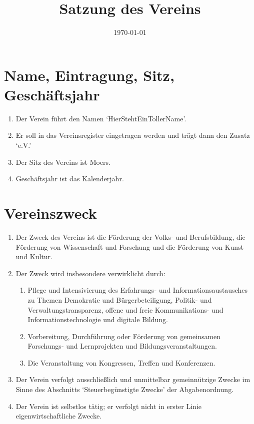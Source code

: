 \documentclass[12pt,a4paper,draft]{article}
\title{Satzung des Vereins \unsername} %
\author{\unsername}
\date{\today}
\newcommand{\unsername}{HierStehtEinTollerName}
\begin{document}
\maketitle
\tableofcontents

\section{Name, Eintragung, Sitz, Geschäftsjahr}
\begin{enumerate}
\item Der Verein führt den Namen `\unsername'.

\item Er soll in das Vereinsregister eingetragen werden und trägt dann den 
Zusatz `e.V.'

\item Der Sitz des Vereins ist Moers. %

\item Geschäftsjahr ist das Kalenderjahr.
\end{enumerate}

\section{Vereinszweck} %
\begin{enumerate}
\item Der Zweck des Vereins ist die Förderung der Volks- und Berufsbildung, die 
Förderung von Wissenschaft und Forschung und die Förderung von Kunst und 
Kultur. %

\item Der Zweck wird insbesondere verwirklicht durch:

\begin{enumerate}
\item Pflege und Intensivierung des Erfahrungs- und Informationsaustausches zu 
Themen Demokratie und Bürgerbeteiligung, Politik- und Verwaltungstransparenz, offene und freie Kommunikations- und Informationstechnologie und digitale Bildung.

\item Vorbereitung, Durchführung oder Förderung von gemeinsamen Forschungs- und 
Lernprojekten und Bildungsveranstaltungen.

\item Die Veranstaltung von Kongressen, Treffen und Konferenzen.
\end{enumerate}

\item Der Verein verfolgt ausschließlich und unmittelbar gemeinnützige Zwecke 
im Sinne des Abschnitts `Steuerbegünstigte Zwecke' der Abgabenordnung.

\item Der Verein ist selbstlos tätig; er verfolgt nicht in erster Linie 
eigenwirtschaftliche Zwecke.
\end{enumerate}
\end{document}
